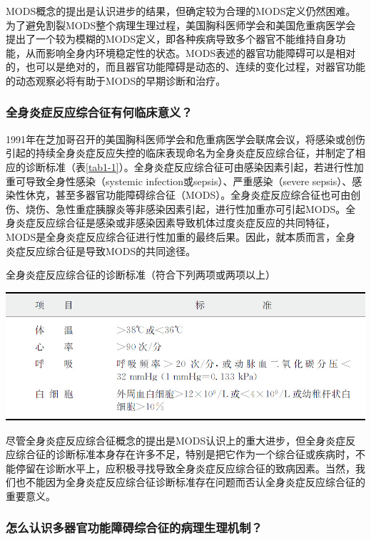 MODS概念的提出是认识进步的结果，但确定较为合理的MODS定义仍然困难。为了避免割裂MODS整个病理生理过程，美国胸科医师学会和美国危重病医学会提出了一个较为模糊的MODS定义，即各种疾病导致多个器官不能维持自身功能，从而影响全身内环境稳定性的状态。MODS表述的器官功能障碍可以是相对的，也可以是绝对的，而且器官功能障碍是动态的、连续的变化过程，对器官功能的动态观察必将有助于MODS的早期诊断和治疗。

\subsubsection{全身炎症反应综合征有何临床意义？}

1991年在芝加哥召开的美国胸科医师学会和危重病医学会联席会议，将感染或创伤引起的持续全身炎症反应失控的临床表现命名为全身炎症反应综合征，并制定了相应的诊断标准（表\ref{tab1-1}）。全身炎症反应综合征可由感染因素引起，若进行性加重可导致全身性感染（systemic
infection或sepsis）、严重感染（severe
sepsis）、感染性休克，甚至多器官功能障碍综合征（MODS）。全身炎症反应综合征也可由创伤、烧伤、急性重症胰腺炎等非感染因素引起，进行性加重亦可引起MODS。全身炎症反应综合征是感染或非感染因素导致机体过度炎症反应的共同特征，MODS是全身炎症反应综合征进行性加重的最终后果。因此，就本质而言，全身炎症反应综合征是导致MODS的共同途径。

\begin{table}[htbp]
\centering
\caption{全身炎症反应综合征的诊断标准（符合下列两项或两项以上）}
\label{tab1-1}
\includegraphics[width=\textwidth,height=\textheight,keepaspectratio]{./images/Image00001.jpg}
\end{table}

尽管全身炎症反应综合征概念的提出是MODS认识上的重大进步，但全身炎症反应综合征的诊断标准本身存在许多不足，特别是把它作为一个综合征或疾病时，不能停留在诊断水平上，应积极寻找导致全身炎症反应综合征的致病因素。当然，我们也不能因为全身炎症反应综合征诊断标准存在问题而否认全身炎症反应综合征的重要意义。

\subsubsection{怎么认识多器官功能障碍综合征的病理生理机制？}

